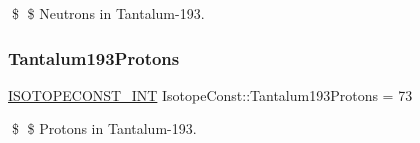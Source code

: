 \$ \$ Neutrons in Tantalum-\/193. \mbox{\label{group___isotope_const-_tantalum-_ta193_gab5657f4fa3ce4bb6ad0ca37e8eecfa93}} 
\subsubsection{\texorpdfstring{Tantalum193\+Protons}{Tantalum193Protons}}
{\footnotesize\ttfamily \mbox{\hyperlink{group___isotope_const-_macros_ga5f18360b3e99483a35c32d789e62621c}{I\+S\+O\+T\+O\+P\+E\+C\+O\+N\+S\+T\+\_\+\+I\+NT}} Isotope\+Const\+::\+Tantalum193\+Protons = 73}

\$ \$ Protons in Tantalum-\/193. 